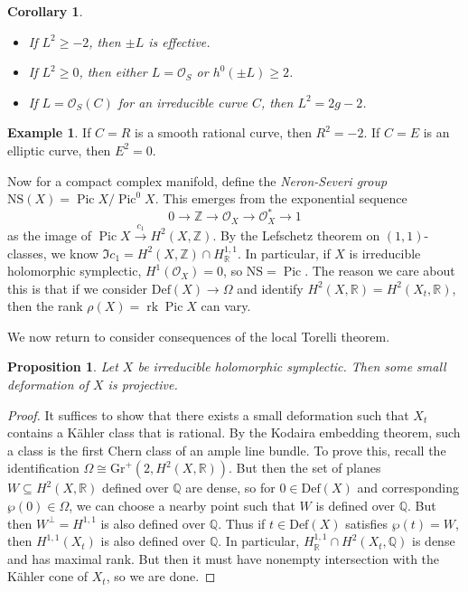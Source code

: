 \documentclass[leqno, openany]{memoir}
\newtheorem{cor}[thm]{Corollary}
\newtheorem{prop}[thm]{Proposition}
\theoremstyle{definition}
\newtheorem{exm}[thm]{Example}
\theoremstyle{remark}
\theoremstyle{plain}
\theoremstyle{definition}
\theoremstyle{remark}
\newcommand{\R}{\mathbb{R}}
\newcommand{\Z}{\mathbb{Z}}
\newcommand{\Q}{\mathbb{Q}}
\newcommand{\mc}[1]{\mathcal{#1}}
\newcommand{\mr}[1]{\mathrm{#1}}
\DeclareMathOperator{\rk}{rk}
\DeclareMathOperator{\Pic}{Pic}
\begin{document}
\begin{cor}\leavevmode
    \begin{itemize}
        \item If $L^2 \geq -2$, then $\pm L$ is effective.
        \item If $L^2 \geq 0$, then either $L = \mc{O}_S$ or $h^0(\pm L) \geq 2$.
        \item If $L = \mc{O}_S(C)$ for an irreducible curve $C$, then $L^2 = 2g-2$.
    \end{itemize}
\end{cor}

\begin{exm}
    If $C = R$ is a smooth rational curve, then $R^2 = -2$. If $C = E$ is an elliptic curve, then $E^2 = 0$.
\end{exm}

Now for a compact complex manifold, define the \textit{Neron-Severi group} $\mr{NS}(X) = \Pic X / \Pic^0 X$. This emerges from the exponential sequence
\[ 0 \to \Z \to \mc{O}_X \to \mc{O}_X^* \to 1 \]
as the image of $\Pic X \xrightarrow{c_1} H^2(X, \Z)$. By the Lefschetz theorem on $(1,1)$-classes, we know $\Im c_1 = H^2(X, \Z) \cap H^{1,1}_{\R}$. In particular, if $X$ is irreducible holomorphic symplectic, $H^1(\mc{O}_X) = 0$, so $\mr{NS} = \Pic$. The reason we care about this is that if we consider $\mr{Def}(X) \to \Omega$ and identify $H^2(X, \R) = H^2(X_t, \R)$, then the rank $\rho(X) = \rk \Pic X$ can vary.

We now return to consider consequences of the local Torelli theorem.
\begin{prop}
    Let $X$ be irreducible holomorphic symplectic. Then some small deformation of $X$ is projective.
\end{prop}

\begin{proof}
    It suffices to show that there exists a small deformation such that $X_t$ contains a K\"ahler class that is rational. By the Kodaira embedding theorem, such a class is the first Chern class of an ample line bundle. To prove this, recall the identification $\Omega \cong \mr{Gr}^+(2, H^2(X, \R))$. But then the set of planes $W \subseteq H^2(X, \R)$ defined over $\Q$ are dense, so for $0 \in \mr{Def}(X)$ and corresponding $\wp(0) \in \Omega$, we can choose a nearby point such that $W$ is defined over $\Q$. But then $W^{\perp} = H^{1,1}$ is also defined over $\Q$. Thus if $t \in \mr{Def}(X)$ satisfies $\wp(t) = W$, then $H^{1,1}(X_t)$ is also defined over $\Q$. In particular, $H^{1,1}_{\R} \cap H^2(X_t, \Q)$ is dense and has maximal rank. But then it must have nonempty intersection with the K\"ahler cone of $X_t$, so we are done.
\end{proof}
\end{document}

